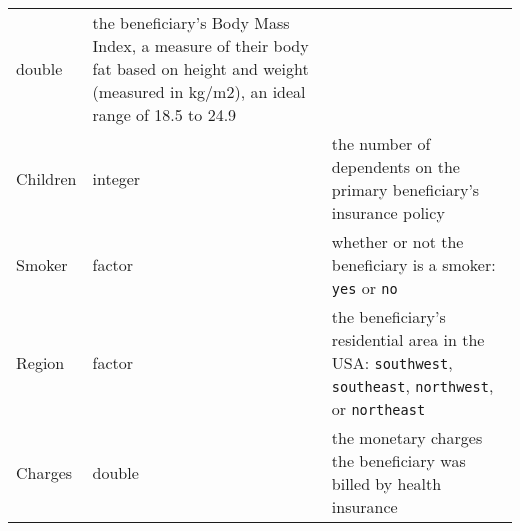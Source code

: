 \documentclass[]{article}
\begin{document}
\begin{longtable}[]{@{}lll@{}}
\begin{minipage}[t]{0.18\columnwidth}
double\strut
\end{minipage} & \begin{minipage}[t]{0.46\columnwidth}\raggedright
the beneficiary's Body Mass Index, a measure of their body fat based on
height and weight (measured in kg/m2), an ideal range of 18.5 to
24.9\strut
\end{minipage}\tabularnewline
\begin{minipage}[t]{0.27\columnwidth}\raggedright
Children\strut
\end{minipage} & \begin{minipage}[t]{0.18\columnwidth}\raggedright
integer\strut
\end{minipage} & \begin{minipage}[t]{0.46\columnwidth}\raggedright
the number of dependents on the primary beneficiary's insurance
policy\strut
\end{minipage}\tabularnewline
\begin{minipage}[t]{0.27\columnwidth}\raggedright
Smoker\strut
\end{minipage} & \begin{minipage}[t]{0.18\columnwidth}\raggedright
factor\strut
\end{minipage} & \begin{minipage}[t]{0.46\columnwidth}\raggedright
whether or not the beneficiary is a smoker: \texttt{yes} or
\texttt{no}\strut
\end{minipage}\tabularnewline
\begin{minipage}[t]{0.27\columnwidth}\raggedright
Region\strut
\end{minipage} & \begin{minipage}[t]{0.18\columnwidth}\raggedright
factor\strut
\end{minipage} & \begin{minipage}[t]{0.46\columnwidth}\raggedright
the beneficiary's residential area in the USA: \texttt{southwest},
\texttt{southeast}, \texttt{northwest}, or \texttt{northeast}\strut
\end{minipage}\tabularnewline
\begin{minipage}[t]{0.27\columnwidth}\raggedright
Charges\strut
\end{minipage} & \begin{minipage}[t]{0.18\columnwidth}\raggedright
double\strut
\end{minipage} & \begin{minipage}[t]{0.46\columnwidth}\raggedright
the monetary charges the beneficiary was billed by health
insurance\strut
\end{minipage}\tabularnewline
\bottomrule
\end{longtable}
\end{document}

